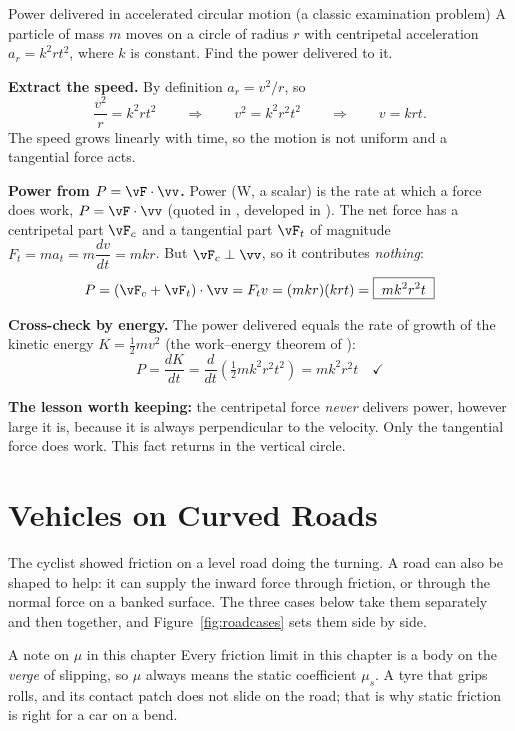 \begin{exbox}{Power delivered in accelerated circular motion \textnormal{(a classic examination problem)}}
A particle of mass $m$ moves on a circle of radius $r$ with centripetal acceleration
$a_r=k^{2}rt^{2}$, where $k$ is constant. Find the power delivered to it.

 \textbf{Extract the speed.} By definition $a_r=v^{2}/r$, so
\[
\frac{v^{2}}{r}=k^{2}rt^{2}
\qquad\Longrightarrow\qquad
v^{2}=k^{2}r^{2}t^{2}
\qquad\Longrightarrow\qquad
v=krt.
\]
The speed grows linearly with time, so the motion is not uniform and a tangential force acts.

 \textbf{Power from $P=\vF\cdot\vv$.} Power (\si{W}, a scalar) is the rate at which a force does
work, $P=\vF\cdot\vv$ (quoted in , developed in ). The net force has a
centripetal part $\vF_c$ and a tangential part $\vF_t$ of magnitude $F_t=ma_t=m\dfrac{dv}{dt}=mkr$. But
$\vF_c\perp\vv$, so it contributes \emph{nothing}:
\[
P=(\vF_c+\vF_t)\cdot\vv=F_tv=(mkr)(krt)=\boxed{\;mk^{2}r^{2}t\;}
\]

 \textbf{Cross-check by energy.} The power delivered equals the rate of growth of the kinetic
energy $K=\tfrac{1}{2}mv^{2}$ (the work--energy theorem of ):
\[
P=\frac{dK}{dt}=\frac{d}{dt}\left(\tfrac{1}{2}mk^{2}r^{2}t^{2}\right)=mk^{2}r^{2}t \quad\checkmark
\]

\smallskip
\textbf{The lesson worth keeping:} the centripetal force \emph{never} delivers power, however large it
is, because it is always perpendicular to the velocity. Only the tangential force does work. This fact
returns in the vertical circle.
\end{exbox}

\section{Vehicles on Curved Roads}\label{sec:roads}
The cyclist showed friction on a level road doing the turning. A road can also be shaped to help: it
can supply the inward force through friction, or through the normal force on a banked surface. The three cases below take them separately and then together, and Figure~\ref{fig:roadcases} sets them side by side.

\begin{remarkbox}{A note on $\mu$ in this chapter}
Every friction limit in this chapter is a body on the \emph{verge} of slipping, so $\mu$ always means the
static coefficient $\mu_s$. A tyre that grips rolls, and its contact patch does not slide on the road;
that is why static friction is right for a car on a bend.
\end{remarkbox}

